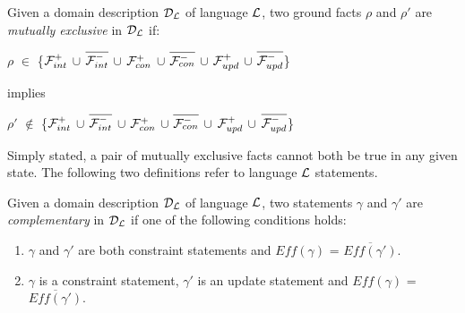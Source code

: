 \documentclass[global,twocolumn,final]{svjour}
\newenvironment{vdefinition}
  {\begin{definition}\hspace{0.25em}}
  {\end{definition}}
\newenvironment{vquote}
  {\begin{list}{}{\leftmargin 1em}\item[]}
  {\end{list}}
\begin{document}
    \begin{vdefinition}
      \label{def-mutex}
      Given a domain description ${\cal D_{L}}$ of language ${\cal L}$,
      two ground facts $\rho$ and $\rho'$ are {\em mutually exclusive}
      in ${\cal D_{L}}$ if:
      \begin{vquote}
        $\rho$ $\in$ \{${\cal F}^{+}_{int}$ $\cup$
        $\overline{{\cal F}^{-}_{int}}$ $\cup$ ${\cal F}^{+}_{con}$ $\cup$
        $\overline{{\cal F}^{-}_{con}}$ $\cup$ ${\cal F}^{+}_{upd}$ $\cup$
        $\overline{{\cal F}^{-}_{upd}}$\}

        implies

        $\rho'$ $\not\in$ \{${\cal F}^{+}_{int}$ $\cup$
        $\overline{{\cal F}^{-}_{int}}$ $\cup$ ${\cal F}^{+}_{con}$ $\cup$
        $\overline{{\cal F}^{-}_{con}}$ $\cup$ ${\cal F}^{+}_{upd}$ $\cup$
        $\overline{{\cal F}^{-}_{upd}}$\}
      \end{vquote}
    \end{vdefinition}

    Simply stated, a pair of mutually exclusive facts cannot both be true
    in any given state. The following two definitions refer to language
    ${\cal L}$ statements.

    \begin{vdefinition}
      \label{def-comp}
      Given a domain description ${\cal D_{L}}$ of language ${\cal L}$,
      two statements $\gamma$ and $\gamma'$ are {\em complementary} in
      ${\cal D_{L}}$ if one of the following conditions holds:
      \begin{enumerate}
        \item
          $\gamma$ and $\gamma'$ are both constraint statements and
          $Eff(\gamma)$ = $\overline{Eff(\gamma')}$.
        \item
          $\gamma$ is a constraint statement, $\gamma'$ is an update
          statement and $Eff(\gamma)$ = $\overline{Eff(\gamma')}$.
      \end{enumerate}
    \end{vdefinition}
\end{document}
